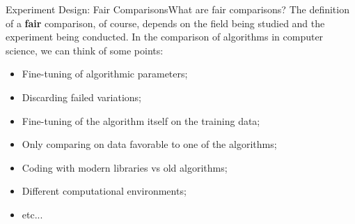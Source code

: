 \begin{frame}{Experiment Design: Fair Comparisons}{What are fair comparisons?}
  The definition of a {\bf fair} comparison, of course, depends on the field being studied and the experiment being conducted. In the comparison of algorithms in computer science, we can think of some points:
  \begin{itemize}
    \item Fine-tuning of algorithmic parameters;
    \item Discarding failed variations;\medskip
    \item Fine-tuning of the algorithm itself on the training data;
    \item Only comparing on data favorable to one of the algorithms;\medskip
    \item Coding with modern libraries vs old algorithms;
    \item Different computational environments;
    \item etc...
  \end{itemize}
\end{frame}
